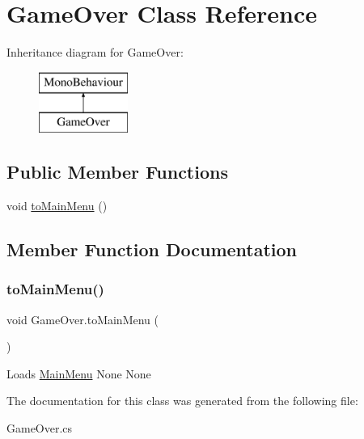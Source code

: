 \hypertarget{class_game_over}{}\section{Game\+Over Class Reference}
\label{class_game_over}
Inheritance diagram for Game\+Over\+:\begin{figure}[H]
\begin{center}
\leavevmode
\includegraphics[height=2.000000cm]{class_game_over}
\end{center}
\end{figure}
\subsection*{Public Member Functions}
\begin{DoxyCompactItemize}
\item 
void \mbox{\hyperlink{class_game_over_af7a0b3719580737182a952c8fb487232}{to\+Main\+Menu}} ()
\end{DoxyCompactItemize}


\subsection{Member Function Documentation}
\mbox{\label{class_game_over_af7a0b3719580737182a952c8fb487232}} 
\subsubsection{\texorpdfstring{to\+Main\+Menu()}{toMainMenu()}}
{\footnotesize\ttfamily void Game\+Over.\+to\+Main\+Menu (\begin{DoxyParamCaption}{ }\end{DoxyParamCaption})\hspace{0.3cm}{\ttfamily [inline]}}

Loads \mbox{\hyperlink{class_main_menu}{Main\+Menu}}  None  None 

The documentation for this class was generated from the following file\+:\begin{DoxyCompactItemize}
\item 
Game\+Over.\+cs\end{DoxyCompactItemize}
